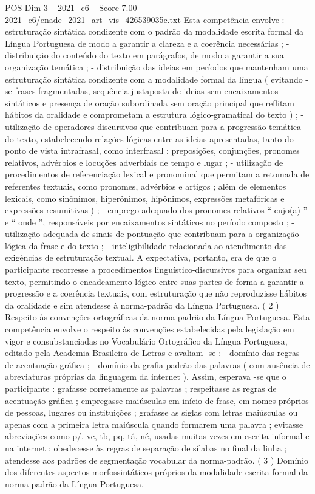 \begin{textsample}{POS Dim 3 – 2021\_c6 – Score 7.00 – 2021\_c6/enade\_2021\_art\_vis\_426539035c.txt}
Esta competência envolve : - estruturação sintática condizente com o padrão da modalidade escrita formal da Língua Portuguesa de modo a garantir a clareza e a coerência necessárias ; - distribuição do conteúdo do texto em parágrafos, de modo a garantir a sua organização temática ; - distribuição das ideias em períodos que mantenham uma estruturação sintática condizente com a modalidade formal da língua ( evitando -se frases fragmentadas, sequência justaposta de ideias sem encaixamentos sintáticos e presença de oração subordinada sem oração principal que reflitam hábitos da oralidade e comprometam a estrutura lógico-gramatical do texto ) ; - utilização de operadores discursivos que contribuam para a progressão temática do texto, estabelecendo relações lógicas entre as ideias apresentadas, tanto do ponto de vista intrafrasal, como interfrasal : preposições, conjunções, pronomes relativos, advérbios e locuções adverbiais de tempo e lugar ; - utilização de procedimentos de referenciação lexical e pronominal que permitam a retomada de referentes textuais, como pronomes, advérbios e artigos ; além de elementos lexicais, como sinônimos, hiperônimos, hipônimos, expressões metafóricas e expressões resumitivas ) ; - emprego adequado dos pronomes relativos “ cujo(a) ” e “ onde ”, responsáveis por encaixamentos sintáticos no período composto ; - utilização adequada de sinais de pontuação que contribuam para a organização lógica da frase e do texto ; - inteligibilidade relacionada ao atendimento das exigências de estruturação textual.
A expectativa, portanto, era de que o participante recorresse a procedimentos linguístico-discursivos para organizar seu texto, permitindo o encadeamento lógico entre suas partes de forma a garantir a progressão e a coerência textuais, com estruturação que não reproduzisse hábitos da oralidade e sim atendesse à norma-padrão da Língua Portuguesa. ( 2 ) Respeito às convenções ortográficas da norma-padrão da Língua Portuguesa.
Esta competência envolve o respeito às convenções estabelecidas pela legislação em vigor e consubstanciadas no Vocabulário Ortográfico da Língua Portuguesa, editado pela Academia Brasileira de Letras e avaliam -se : - domínio das regras de acentuação gráfica ; - domínio da grafia padrão das palavras ( com ausência de abreviaturas próprias da linguagem da internet ).
Assim, esperava -se que o participante : grafasse corretamente as palavras ; respeitasse as regras de acentuação gráfica ; empregasse maiúsculas em início de frase, em nomes próprios de pessoas, lugares ou instituições ; grafasse as siglas com letras maiúsculas ou apenas com a primeira letra maiúscula quando formarem uma palavra ; evitasse abreviações como p/, vc, tb, pq, tá, né, usadas muitas vezes em escrita informal e na internet ; obedecesse às regras de separação de sílabas no final da linha ; atendesse aos padrões de segmentação vocabular da norma-padrão. ( 3 ) Domínio dos diferentes aspectos morfossintáticos próprios da modalidade escrita formal da norma-padrão da Língua Portuguesa.

\end{textsample}
